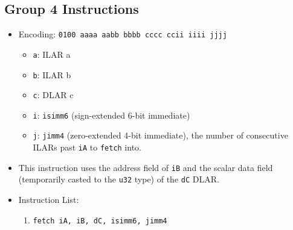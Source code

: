 \documentclass{article}
\begin{document}
	\subsection{Group 4 Instructions}
		\begin{itemize}
		\item Encoding:  \texttt{0100 aaaa aabb bbbb  cccc ccii iiii jjjj}
			\begin{itemize}
			\item \texttt{a}:  ILAR a
			\item \texttt{b}:  ILAR b
			\item \texttt{c}:  DLAR c
			\item \texttt{i}:  \texttt{isimm6} (sign-extended 6-bit
			immediate)
			\item \texttt{j}:  \texttt{jimm4} (zero-extended 4-bit
			immediate), the number of consecutive ILARs past \texttt{iA} to
			\texttt{fetch} into.
			\end{itemize}

		\item This instruction uses the address field of \texttt{iB} and
		the scalar data field (temporarily casted to the \texttt{u32} type)
		of the \texttt{dC} DLAR.

		\item Instruction List:
			\begin{enumerate}
			\item \texttt{fetch iA, iB, dC, isimm6, jimm4}
			\end{enumerate}
		\end{itemize}
		\newpage
\end{document}
